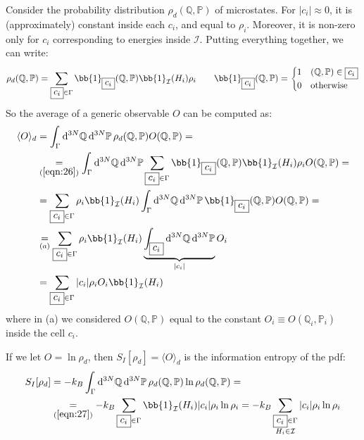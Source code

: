 \documentclass[../../main.tex]{subfiles}
\begin{document}
Consider the probability distribution $\rho_d(\mathbb{Q}, \mathbb{P})$ of microstates. For $|c_i| \approx 0$, it is (approximately) constant inside each $\boxed{c_i}$, and equal to $\rho_i$. Moreover, it is non-zero only for $\boxed{c_i}$ corresponding to energies inside $\mathcal{I}$. Putting everything together, we can write:
\begin{align}\label{eqn:26}
    \rho_d(\mathbb{Q}, \mathbb{P}) = \sum_{\boxed{c_i} \in \Gamma} \bb{1}_{\boxed{c_i}}(\mathbb{Q}, \mathbb{P}) \bb{1}_{\mathcal{I}}(H_i) \rho_i \qquad \bb{1}_{\boxed{c_i}}(\mathbb{Q}, \mathbb{P}) = \begin{cases}
        1 & (\mathbb{Q},\mathbb{P}) \in \boxed{c_i}\\
        0 & \text{otherwise}
    \end{cases}
\end{align}
So the average of a generic observable $O$ can be computed as:
\begin{align} \nonumber
    \langle O \rangle_d &= \int_{\Gamma} \dd[3N]{\mathbb{Q}} \dd[3N]{\mathbb{P}} \rho_d(\mathbb{Q}, \mathbb{P}) O(\mathbb{Q}, \mathbb{P}) =\\ \nonumber
    &\underset{(\ref{eqn:26})}{=}  \int_{\Gamma} \dd[3N]{\mathbb{Q}} \dd[3N]{\mathbb{P}} \sum_{\boxed{c_i} \in \Gamma} \bb{1}_{\boxed{c_i}}(\mathbb{Q}, \mathbb{P}) \bb{1}_{\mathcal{I}}(H_i) \rho_iO(\mathbb{Q}, \mathbb{P}) =
    \\ \nonumber
    &=\sum_{\boxed{c_i} \in \Gamma} \rho_i \bb{1}_{\mathcal{I}}(H_i) \int_{\Gamma} \dd[3N]{\mathbb{Q}}\dd[3N]{\mathbb{P}} \bb{1}_{\boxed{c_i}}(\mathbb{Q}, \mathbb{P}) O(\mathbb{Q}, \mathbb{P}) =\\ \nonumber
    &\underset{(a)}{=}  \sum_{\boxed{c_i} \in \Gamma} \rho_i \bb{1}_{\mathcal{I}}(H_i) \underbrace{\int_{\boxed{c_i}} \dd[3N]{\mathbb{Q}} \dd[3N]{\mathbb{P}}}_{|c_i|} O_i\\ \label{eqn:27}
    &= \sum_{\boxed{c_i} \in \Gamma}|c_i| \rho_i O_i \bb{1}_{\mathcal{I}}(H_i)
\end{align}
where in (a) we considered $O(\mathbb{Q}, \mathbb{P})$ equal to the constant $O_i \equiv O(\mathbb{Q}_i, \mathbb{P}_i)$ inside the cell $\boxed{c_i}$.

\medskip

If we let $O = \ln \rho_d$, then $S_I[\rho_d] = \langle O \rangle_d$ is the information entropy of the pdf:
\begin{align}\label{eqn:28}
    S_I[\rho_d] &= - k_B \int_{\Gamma} \dd[3N]{\mathbb{Q}} \dd[3N]{\mathbb{P}}\rho_d(\mathbb{Q}, \mathbb{P}) \ln \rho_d(\mathbb{Q}, \mathbb{P})  =\\
    &\underset{(\ref{eqn:27})}{=}  - k_B \sum_{\boxed{c_i} \in \Gamma} \bb{1}_{\mathcal{I}}(H_i) |c_i| \rho_i \ln \rho_i = -k_B \sum_{\substack{\boxed{c_i} \in \Gamma\\H_i \in \mathcal{I}}} |c_i| \rho_i \ln \rho_i
\end{align}
\end{document}
